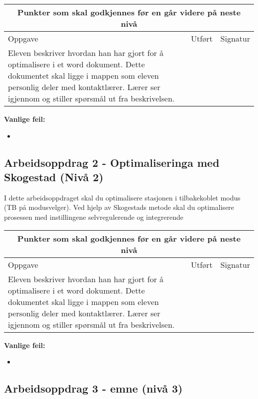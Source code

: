 \begin{center} \begin{tabular}{ | m{8cm} | m{1cm}| m{2cm} | } 
\hline
\multicolumn{3}{|c|}{Punkter som skal godkjennes før en går videre på neste nivå} \\
	\hline
	Oppgave	& Utført & Signatur \\ 
	\hline
Eleven beskriver hvordan han har gjort for å optimalisere i et word dokument. Dette dokumentet skal ligge i mappen som eleven personlig deler med kontaktlærer. Lærer ser igjennom og stiller spørsmål ut fra beskrivelsen.& & \\ 
	\hline
\end{tabular}
\end{center}

\textbf{Vanlige feil:}
\begin{itemize}[noitemsep]
	\item 
\end{itemize}
\newpage
\subsection*{Arbeidsoppdrag 2 - Optimaliseringa med Skogestad (Nivå 2)}

I dette arbeidsoppdraget skal du optimalisere stasjonen i tilbakekoblet modus (TB på modusvelger). Ved hjelp av Skogestads metode skal du optimalisere prosessen med instillingene selvregulerende og integrerende

\begin{center}
\begin{tabular}{ | m{8cm} | m{1cm}| m{2cm} | } 
\hline
\multicolumn{3}{|c|}{Punkter som skal godkjennes før en går videre på neste nivå} \\
	\hline
	Oppgave	& Utført & Signatur \\ 
	\hline
Eleven beskriver hvordan han har gjort for å optimalisere i et word dokument. Dette dokumentet skal ligge i mappen som eleven personlig deler med kontaktlærer. Lærer ser igjennom og stiller spørsmål ut fra beskrivelsen.& & \\ 
	\hline
\end{tabular}
\end{center}
\textbf{Vanlige feil:}
\begin{itemize}[noitemsep]
	\item 
\end{itemize}
\newpage
\subsection*{Arbeidsoppdrag 3 - emne (nivå 3)}


